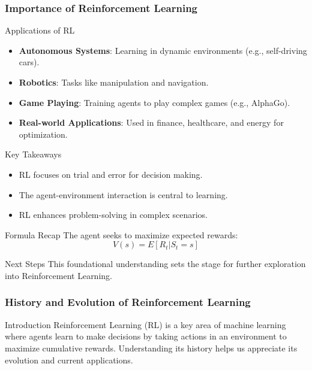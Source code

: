\documentclass[aspectratio=169]{beamer}
\begin{document}
\begin{frame}[fragile]
    \frametitle{Importance of Reinforcement Learning}
    \begin{block}{Applications of RL}
        \begin{itemize}
            \item \textbf{Autonomous Systems}: Learning in dynamic environments (e.g., self-driving cars).
            \item \textbf{Robotics}: Tasks like manipulation and navigation.
            \item \textbf{Game Playing}: Training agents to play complex games (e.g., AlphaGo).
            \item \textbf{Real-world Applications}: Used in finance, healthcare, and energy for optimization.
        \end{itemize}
    \end{block}

    \begin{block}{Key Takeaways}
        \begin{itemize}
            \item RL focuses on trial and error for decision making.
            \item The agent-environment interaction is central to learning.
            \item RL enhances problem-solving in complex scenarios.
        \end{itemize}
    \end{block}

    \begin{block}{Formula Recap}
        The agent seeks to maximize expected rewards:
        \begin{equation}
            V(s) = E[R_t | S_t = s]
        \end{equation}
    \end{block}
    
    \begin{block}{Next Steps}
        This foundational understanding sets the stage for further exploration into Reinforcement Learning.
    \end{block}
\end{frame}

\begin{frame}[fragile]
    \frametitle{History and Evolution of Reinforcement Learning}
    \begin{block}{Introduction}
        Reinforcement Learning (RL) is a key area of machine learning where agents learn to make decisions by taking actions in an environment to maximize cumulative rewards. Understanding its history helps us appreciate its evolution and current applications.
    \end{block}
\end{frame}
\end{document}
